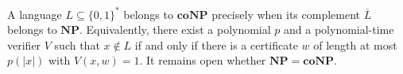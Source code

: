 
A language $L\subseteq\{0,1\}^*$ belongs to $\mathbf{coNP}$ precisely when its complement $\overline L$ belongs to $\mathbf{NP}$. Equivalently, there exist a polynomial $p$ and a polynomial-time verifier $V$ such that $x\notin L$ if and only if there is a certificate $w$ of length at most $p(|x|)$ with $V(x,w)=1$. It remains open whether $\mathbf{NP}=\mathbf{coNP}$.
